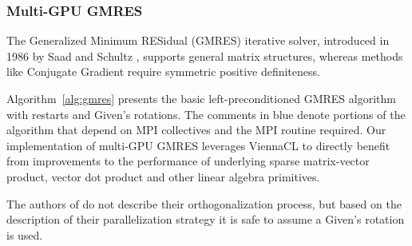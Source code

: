 \subsubsection{Multi-GPU GMRES}

The Generalized Minimum RESidual (GMRES) iterative solver, introduced in 1986 by Saad and Schultz \cite{Saad1986}, supports general matrix structures, whereas methods like Conjugate Gradient require symmetric positive definiteness. 



Algorithm~\ref{alg:gmres} presents the basic left-preconditioned GMRES algorithm with restarts and Given's rotations. The comments in blue denote portions of the algorithm that depend on MPI collectives and the MPI routine required. Our implementation of multi-GPU GMRES leverages ViennaCL to directly benefit from improvements to the performance of underlying sparse matrix-vector product, vector dot product and other linear algebra primitives. 

%


 




The authors of \cite{Bahi2011} do not describe their orthogonalization process, but based on the description of their parallelization strategy it is safe to assume a Given's rotation is used.


